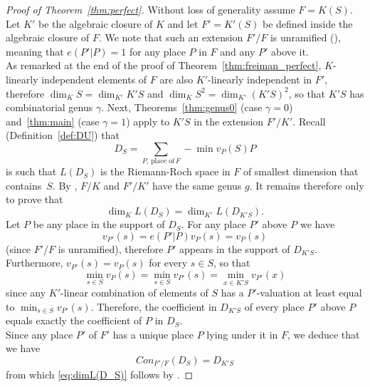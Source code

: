 \documentclass{article}
\theoremstyle{plain}
\theoremstyle{definition}
\theoremstyle{remark}
\begin{document}
{
  \begin{proof}[Proof of Theorem~\ref{thm:perfect}]
  Without loss of generality assume $F=K(S)$.
  Let $K'$ be the algebraic closure of $K$ and let $F'=K'(S)$ be
  defined inside the algebraic closure of $F$. 
  We note that such an extension $F'/F$ is unramified (\cite[Theorem
  III.6.3(a)]{Stichtenoth}), meaning that $e(P'|P)=1$ for any place
  $P$ in $F$ and any $P'$ above it.\\
  \indent
  As remarked at the end
  of the proof of Theorem~\ref{thm:freiman_perfect}, $K$-linearly
  independent elements of $F$ are also $K'$-linearly independent in
  $F'$,
  therefore $\dim_KS=\dim_{K'}K'S$ and $\dim_KS^2=\dim_{K'}(K'S)^2$,
  so that $K'S$ has combinatorial genus $\gamma$. Next,
  Theorems~\ref{thm:genus0} (case $\gamma=0$) and~\ref{thm:main} (case
  $\gamma=1$) apply to $K'S$ in the extension $F'/K'$.
  \newline
  \indent Recall (Definition~\ref{def:DU}) that 
   $$D_S =\sum_{P,\, \text{place of}\, F}-\min v_P(S)P$$
   is such that $L(D_S)$ is the Riemann-Roch space in $F$ of smallest
   dimension that contains~$S$. By \cite[Theorem
   III.6.3(b)]{Stichtenoth}, $F/K$ and $F'/K'$ have the same genus
   $g$. It remains therefore only to prove that
   \begin{equation}
     \label{eq:dimL(D_S)}
     \dim_KL(D_S) = \dim_{K'}L(D_{K'S}).
   \end{equation}
   Let $P$ be any place in the support of $D_S$.
   For any
   place $P'$
   above $P$ we have $$v_{P'}(s) = e(P'|P)v_P(s)=v_P(s)$$ (since $F'/F$
   is unramified), therefore
   $P'$ appears in the support of $D_{K'S}$. Furthermore,
   $v_{P'}(s)=v_P(s)$ for every $s\in S$, so that
   $$\min_{s\in S}v_P(s) = \min_{s\in S}v_{P'}(s) = \min_{x\in
     K'S}v_{P'}(x)$$
   since any $K'$-linear combination of elements of $S$ has a
   $P'$-valuation at least equal to $\min_{s\in S}v_{P'}(s)$.
   Therefore, the coefficient in $D_{K'S}$ of every place $P'$ above
   $P$ equals exactly the coefficient of $P$ in $D_S$.\\
   \indent
   Since any
   place $P'$ of $F'$ has a unique place $P$ lying under it in $F$, we
   deduce that we have
   $$Con_{F'/F}(D_S) = D_{K'S}$$
   from which \eqref{eq:dimL(D_S)} follows by
   \cite[Theorem III.6.3(d)]{Stichtenoth}.
   \end{proof}
}
\end{document}
